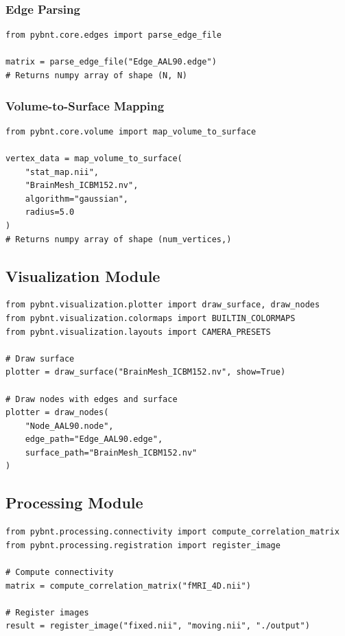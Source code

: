 \documentclass[11pt,a4paper]{article}
\begin{document}
\subsubsection{Edge Parsing}

\begin{lstlisting}[caption=pybnt.core.edges]
from pybnt.core.edges import parse_edge_file

matrix = parse_edge_file("Edge_AAL90.edge")
# Returns numpy array of shape (N, N)
\end{lstlisting}

\subsubsection{Volume-to-Surface Mapping}

\begin{lstlisting}[caption=pybnt.core.volume]
from pybnt.core.volume import map_volume_to_surface

vertex_data = map_volume_to_surface(
    "stat_map.nii",
    "BrainMesh_ICBM152.nv",
    algorithm="gaussian",
    radius=5.0
)
# Returns numpy array of shape (num_vertices,)
\end{lstlisting}

\subsection{Visualization Module}

\begin{lstlisting}[caption=pybnt.visualization]
from pybnt.visualization.plotter import draw_surface, draw_nodes
from pybnt.visualization.colormaps import BUILTIN_COLORMAPS
from pybnt.visualization.layouts import CAMERA_PRESETS

# Draw surface
plotter = draw_surface("BrainMesh_ICBM152.nv", show=True)

# Draw nodes with edges and surface
plotter = draw_nodes(
    "Node_AAL90.node",
    edge_path="Edge_AAL90.edge",
    surface_path="BrainMesh_ICBM152.nv"
)
\end{lstlisting}

\subsection{Processing Module}

\begin{lstlisting}[caption=pybnt.processing]
from pybnt.processing.connectivity import compute_correlation_matrix
from pybnt.processing.registration import register_image

# Compute connectivity
matrix = compute_correlation_matrix("fMRI_4D.nii")

# Register images
result = register_image("fixed.nii", "moving.nii", "./output")
\end{lstlisting}
\end{document}
